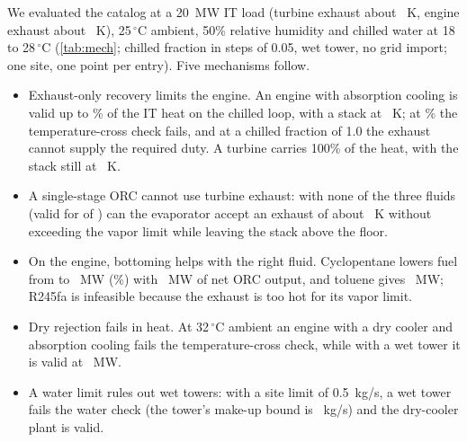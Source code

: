 We evaluated the catalog at a 20~MW IT load (turbine exhaust about ~K, engine exhaust about ~K), 25\,$^\circ$C ambient, 50\% relative humidity and
chilled water at 18 to 28\,$^\circ$C (\cref{tab:mech}; chilled fraction in steps of 0.05, wet tower, no grid import; one site, one point per entry). Five mechanisms follow.
\begin{itemize}[leftmargin=*,itemsep=1pt]
\item Exhaust-only recovery limits the engine. An engine with absorption cooling is valid up to \% of the IT heat on the chilled loop, with a stack at ~K; at \%
the temperature-cross check fails, and at a chilled fraction of 1.0 the exhaust cannot supply the required duty. A turbine carries 100\% of the heat, with the stack still at ~K.
\item A single-stage ORC cannot use turbine exhaust: with none of the three fluids (valid for  of ) can the evaporator accept an exhaust of about ~K without exceeding the vapor limit while leaving the stack above the floor.
\item On the engine, bottoming helps with the right fluid. Cyclopentane lowers fuel from  to ~MW (\%) with ~MW of net ORC output, and toluene gives ~MW; R245fa is infeasible because the exhaust is too hot for its vapor limit.
\item Dry rejection fails in heat. At 32\,$^\circ$C ambient an engine with a dry cooler and absorption cooling fails the temperature-cross check, while with a wet tower it is valid at ~MW.
\item A water limit rules out wet towers: with a site limit of 0.5~kg/s, a wet tower fails the water check (the tower's make-up bound is ~kg/s) and the dry-cooler plant is valid.
\end{itemize}

\begin{table}[tbp]
\centering

\caption{Fuel use and stack temperature of engine and turbine plants with absorption cooling and a wet tower against the share of the IT heat carried by the chilled loop (20~MW IT load,
simulation, $n=2$ plants per row, assumed constants). ``Infeasible'' marks a plant that fails a hard check or cannot be sized. Data: \texttt{assets/mechanisms.json}.}
\label{tab:mech}
\end{table}

